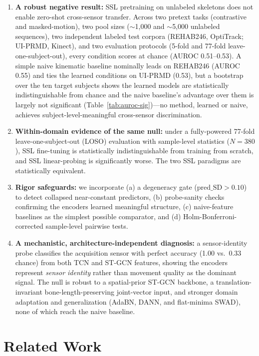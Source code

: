 \documentclass[10pt,journal]{IEEEtran}
\begin{document}
\begin{enumerate}
    \item \textbf{A robust negative result:} SSL pretraining on unlabeled skeletons does not enable zero-shot cross-sensor transfer. Across two pretext tasks (contrastive and masked-motion), two pool sizes ($\sim$1,000 and $\sim$5,000 unlabeled sequences), two independent labeled test corpora (REHAB246, OptiTrack; UI-PRMD, Kinect), and two evaluation protocols (5-fold and 77-fold leave-one-subject-out), every condition scores at chance (AUROC 0.51--0.53). A simple naive kinematic baseline nominally leads on REHAB246 (AUROC 0.55) and ties the learned conditions on UI-PRMD (0.53), but a bootstrap over the ten target subjects shows the learned models are statistically indistinguishable from chance and the naive baseline's advantage over them is largely not significant (Table~\ref{tab:auroc-sig})---no method, learned or naive, achieves subject-level-meaningful cross-sensor discrimination.
    \item \textbf{Within-domain evidence of the same null:} under a fully-powered 77-fold leave-one-subject-out (LOSO) evaluation with sample-level statistics ($N=380$), SSL fine-tuning is statistically indistinguishable from training from scratch, and SSL linear-probing is significantly worse. The two SSL paradigms are statistically equivalent.
    \item \textbf{Rigor safeguards:} we incorporate (a) a degeneracy gate ($\text{pred\_SD} > 0.10$) to detect collapsed near-constant predictors, (b) probe-sanity checks confirming the encoders learned meaningful structure, (c) naive-feature baselines as the simplest possible comparator, and (d) Holm-Bonferroni-corrected sample-level pairwise tests.
    \item \textbf{A mechanistic, architecture-independent diagnosis:} a sensor-identity probe classifies the acquisition sensor with perfect accuracy (1.00 vs.\ 0.33 chance) from both TCN and ST-GCN features, showing the encoders represent \emph{sensor identity} rather than movement quality as the dominant signal. The null is robust to a spatial-prior ST-GCN backbone, a translation-invariant bone-length-preserving joint-vector input, and stronger domain adaptation and generalization (AdaBN, DANN, and flat-minima SWAD), none of which reach the naive baseline.
\end{enumerate}

\section{Related Work}
\label{sec:related}
\end{document}
